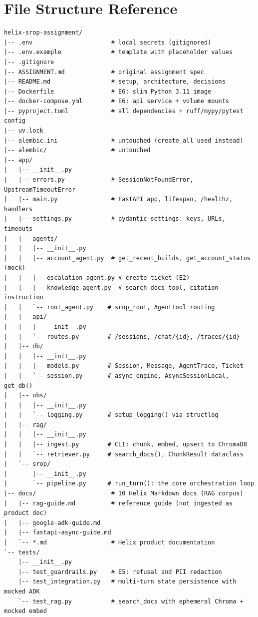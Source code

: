 \documentclass[12pt,a4paper]{article}
\begin{document}
\section{File Structure Reference}

\begin{lstlisting}[numbers=none, basicstyle=\ttfamily\footnotesize]
helix-srop-assignment/
|-- .env                      # local secrets (gitignored)
|-- .env.example              # template with placeholder values
|-- .gitignore
|-- ASSIGNMENT.md             # original assignment spec
|-- README.md                 # setup, architecture, decisions
|-- Dockerfile                # E6: slim Python 3.11 image
|-- docker-compose.yml        # E6: api service + volume mounts
|-- pyproject.toml            # all dependencies + ruff/mypy/pytest config
|-- uv.lock
|-- alembic.ini               # untouched (create_all used instead)
|-- alembic/                  # untouched
|-- app/
|   |-- __init__.py
|   |-- errors.py             # SessionNotFoundError, UpstreamTimeoutError
|   |-- main.py               # FastAPI app, lifespan, /healthz, handlers
|   |-- settings.py           # pydantic-settings: keys, URLs, timeouts
|   |-- agents/
|   |   |-- __init__.py
|   |   |-- account_agent.py  # get_recent_builds, get_account_status (mock)
|   |   |-- escalation_agent.py # create_ticket (E2)
|   |   |-- knowledge_agent.py  # search_docs tool, citation instruction
|   |   `-- root_agent.py    # srop_root, AgentTool routing
|   |-- api/
|   |   |-- __init__.py
|   |   `-- routes.py        # /sessions, /chat/{id}, /traces/{id}
|   |-- db/
|   |   |-- __init__.py
|   |   |-- models.py        # Session, Message, AgentTrace, Ticket
|   |   `-- session.py       # async_engine, AsyncSessionLocal, get_db()
|   |-- obs/
|   |   |-- __init__.py
|   |   `-- logging.py       # setup_logging() via structlog
|   |-- rag/
|   |   |-- __init__.py
|   |   |-- ingest.py        # CLI: chunk, embed, upsert to ChromaDB
|   |   `-- retriever.py     # search_docs(), ChunkResult dataclass
|   `-- srop/
|       |-- __init__.py
|       `-- pipeline.py      # run_turn(): the core orchestration loop
|-- docs/                     # 10 Helix Markdown docs (RAG corpus)
|   |-- rag-guide.md          # reference guide (not ingested as product doc)
|   |-- google-adk-guide.md
|   |-- fastapi-async-guide.md
|   `-- *.md                  # Helix product documentation
`-- tests/
    |-- __init__.py
    |-- test_guardrails.py    # E5: refusal and PII redaction
    |-- test_integration.py   # multi-turn state persistence with mocked ADK
    `-- test_rag.py           # search_docs with ephemeral Chroma + mocked embed
\end{lstlisting}
\end{document}
